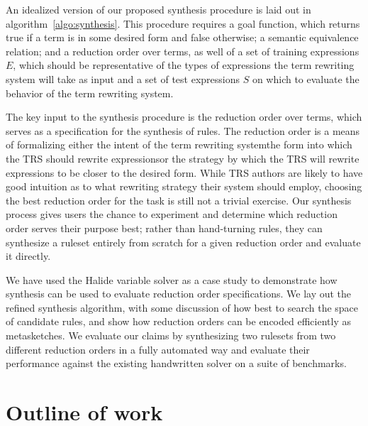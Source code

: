 An idealized version of our proposed synthesis procedure is laid out in algorithm~\ref{algo:synthesis}. This procedure requires a goal function, which returns true if a term is in some desired form and false otherwise; a semantic equivalence relation; and a reduction order over terms, as well of a set of training expressions $E$, which should be representative of the types of expressions the term rewriting system will take as input and a set of test expressions $S$ on which to evaluate the behavior of the term rewriting system.

The key input to the synthesis procedure is the reduction order over terms, which serves as a specification for the synthesis of rules. The reduction order is a means of formalizing either the intent of the term rewriting system\textemdash the form into which the TRS should rewrite expressions\textemdash or the strategy by which the TRS will rewrite expressions to be closer to the desired form. While TRS authors are likely to have good intuition as to what rewriting strategy their system should employ, choosing the best reduction order for the task is still not a trivial exercise. Our synthesis process gives users the chance to experiment and determine which reduction order serves their purpose best; rather than hand-turning rules, they can synthesize a ruleset entirely from scratch for a given reduction order and evaluate it directly.

We have used the Halide variable solver as a case study to demonstrate how synthesis can be used to evaluate reduction order specifications. We lay out the refined synthesis algorithm, with some discussion of how best to search the space of candidate rules, and show how reduction orders can be encoded efficiently as metasketches. We evaluate our claims by synthesizing two rulesets from two different reduction orders in a fully automated way and evaluate their performance against the existing handwritten solver on a suite of benchmarks.

\section{Outline of work}

